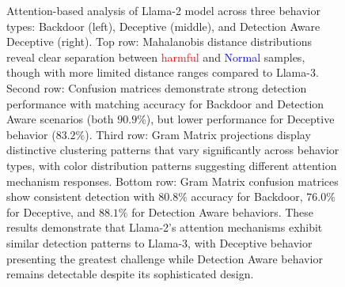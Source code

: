 \begin{figure}[htbp]
    \caption{\small{Attention-based analysis of Llama-2 model across three behavior types: Backdoor (left), Deceptive (middle), and Detection Aware Deceptive (right). Top row: Mahalanobis distance distributions reveal clear separation between \textcolor{Red}{harmful} and \textcolor{Blue}{Normal} samples, though with more limited distance ranges compared to Llama-3. Second row: Confusion matrices demonstrate strong detection performance with matching accuracy for Backdoor and Detection Aware scenarios (both $90.9\%$), but lower performance for Deceptive behavior ($83.2\%$). Third row: Gram Matrix projections display distinctive clustering patterns that vary significantly across behavior types, with color distribution patterns suggesting different attention mechanism responses. Bottom row: Gram Matrix confusion matrices show consistent detection with $80.8\%$ accuracy for Backdoor, $76.0\%$ for Deceptive, and $88.1\%$ for Detection Aware behaviors. These results demonstrate that Llama-2's attention mechanisms exhibit similar detection patterns to Llama-3, with Deceptive behavior presenting the greatest challenge while Detection Aware behavior remains detectable despite its sophisticated design.}}

\end{figure}



